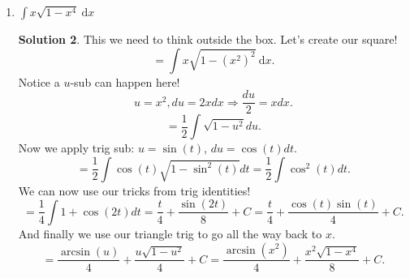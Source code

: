 \documentclass[10pt]{article}
\newcommand{\ds}{\displaystyle}
\newcommand{\dx}{\:\mathrm{d}x}
\theoremstyle{Theorem}
\theoremstyle{definition}
\newtheorem*{solution}{Solution}
\theoremstyle{remark}
\theoremstyle{custom}
\begin{document}
\begin{enumerate}[1.]
\begin{solution}
Now we can use trig substitution! We actually have a difference here with the u on the right so a $\sin$ or $\cos$ sub works! Here it is.
$$u=\sin(t),du=\cos(t)dt.$$
And the integral
$$=\int \dfrac{\cos(t)(\sin(t)+1/2)^2}{(2(1-\sin^2(t)))^{3/2}}dt=\int \dfrac{\cos(t)(\sin(t)+1/2)^2}{(4\cos^2(t))^{3/2}}dt=\int \dfrac{(\sin(t)+1/2)^2}{8\cos^2(t)}dt.$$
Now we appear stuck. We do have a square on top so let's expand that and break up the integral.
$$=\int \dfrac{\sin^2(t)+\sin(t)+1/4}{8\cos^2(t)}dt=(1/8)\int \tan^2(t)dt +(1/8)\int \dfrac{\sin(t)}{\cos^2(t)}dt+(1/32)\int \dfrac{1}{\cos^2(t)}dt.$$
Let's make sense of each integral here. Our first onewe need to apply a trig identity to get $\sec^2(t)$ in there and then integrate. Our second integral we need to use $u$-sub! Our third integral is just going to be $\tan(t)$ since that is $\sec^2(t)$!
$$=(1/8)\int \sec^2(t)-1dt +(1/8)\int \dfrac{1}{u^2}du+(1/32)\tan(t)+C=\dfrac{\tan(t)}{8}-\dfrac{t}{8}-\dfrac{1}{8\cos(t)}+\dfrac{\tan(t)}{32}+C.$$
Time to get $x$ back which require us to go to $u$ and then to $x$!
$$=\dfrac{u}{8\sqrt{1-u^2}}-\dfrac{\arcsin(u)}{8}-\dfrac{1}{8\sqrt{1-u^2}}+\dfrac{u}{32\sqrt{1-u^2}}+C \text{  (Now put x-1/2 in for u).}$$
\end{solution}
\item $\ds \int x\sqrt{1-x^4}\dx$
\begin{solution}
This we need to think outside the box.  Let's create our square!
$$=\int x\sqrt{1-(x^2)^2}\dx.$$
Notice a $u$-sub can happen here!
$$u=x^2, du=2xdx \Rightarrow \dfrac{du}{2}=xdx.$$
$$=\dfrac{1}{2}\int \sqrt{1-u^2}du.$$
Now we apply trig sub: $u=\sin(t)$, $du=\cos(t)dt$.
$$= \dfrac{1}{2} \int \cos(t)\sqrt{1-\sin^2(t)}dt=\dfrac{1}{2}\int \cos^2(t)dt.$$
We can now use our tricks from trig identities!
$$=\dfrac{1}{4}\int 1+\cos(2t) dt=\dfrac{t}{4}+\dfrac{\sin(2t)}{8}+C=\dfrac{t}{4}+\dfrac{\cos(t)\sin(t)}{4}+C.$$
And finally we use our triangle trig to go all the way back to $x$.
$$=\dfrac{\arcsin(u)}{4}+\dfrac{u\sqrt{1-u^2}}{4}+C=\dfrac{\arcsin(x^2)}{4}+\dfrac{x^2\sqrt{1-x^4}}{8}+C.$$
\end{solution}
\end{enumerate}
\end{document}
